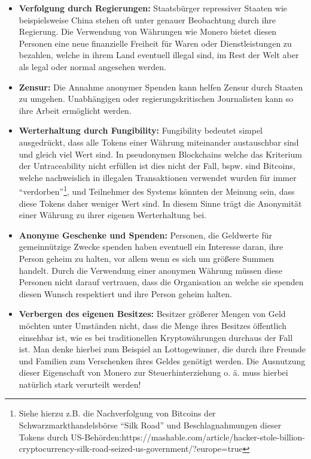 \begin{itemize}
    \item \textbf{Verfolgung durch Regierungen:} Staatsbürger repressiver Staaten wie beispielsweise China stehen oft unter genauer Beobachtung durch ihre Regierung. Die Verwendung von Währungen wie Monero bietet diesen Personen eine neue finanzielle Freiheit
    für Waren oder Dienstleistungen zu bezahlen, welche in ihrem Land eventuell illegal sind, im Rest der Welt aber als legal oder normal angesehen werden.
    \item \textbf{Zensur:} Die Annahme anonymer Spenden kann helfen Zensur durch Staaten zu umgehen. Unabhängigen oder regierungskritischen Journalisten kann so ihre Arbeit ermöglicht werden.
    \item \textbf{Werterhaltung durch Fungibility:} Fungibility bedeutet simpel ausgedrückt, dass alle Tokens einer Währung miteinander austauschbar sind und gleich viel Wert sind. In pseudonymen Blockchains welche das Kriterium der Untraceability nicht erfüllen 
    ist dies nicht der Fall, bspw. sind Bitcoins, welche nachweislich in illegalen Transaktionen verwendet wurden für immer ``verdorben''\footnote{Siehe hierzu z.B. die Nachverfolgung von Bitcoins der Schwarzmarkthandelsbörse ``Silk Road'' und Beschlagnahmungen
    dieser Tokens durch US-Behörden:https://mashable.com/article/hacker-stole-billion-cryptocurrency-silk-road-seized-us-government/?europe=true }, und Teilnehmer des Systems könnten der Meinung sein, dass diese Tokens daher weniger Wert sind. In diesem Sinne trägt
    die Anonymität einer Währung zu ihrer eigenen Werterhaltung bei.
    \item \textbf{Anonyme Geschenke und Spenden:} Personen, die Geldwerte für gemeinnützige Zwecke spenden haben eventuell ein Interesse daran, ihre Person geheim zu halten, vor allem wenn es sich um größere Summen handelt. Durch die Verwendung einer 
    anonymen Währung müssen diese Personen nicht darauf vertrauen, dass die Organisation an welche sie spenden diesen Wunsch respektiert und ihre Person geheim halten.
    \item \textbf{Verbergen des eigenen Besitzes:} Besitzer größerer Mengen von Geld möchten unter Umständen nicht, dass die Menge ihres Besitzes öffentlich einsehbar ist, wie es bei traditionellen Kryptowährungen durchaus der Fall ist. Man denke
    hierbei zum Beispiel an Lottogewinner, die durch ihre Freunde und Familien zum Verschenken ihres Geldes genötigt werden. Die Ausnutzung dieser Eigenschaft von Monero zur Steuerhinterziehung o. ä. muss hierbei natürlich stark verurteilt werden!

\end{itemize}
